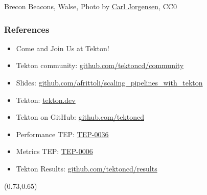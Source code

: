\documentclass[aspectratio=169,11pt,hyperref={colorlinks=true}]{beamer}
\begin{document}
\begin{sectionwithpiclargecentral}{Brecon Beacons, Walse, Photo by \href{https://unsplash.com/@scamartist}{\underline{Carl Jorgensen}}, CC0}
\end{sectionwithpiclargecentral}

\begin{blackframe}
  \frametitle{References}
  \begin{itemize}
    \item \large Come and Join Us at Tekton!
    \item \normalsize Tekton community: \href{https://github.com/tektoncd/community}{github.com/tektoncd/community} \\
  \end{itemize}
  \begin{itemize}
    \item Slides: \href{https://github.com/afrittoli/scaling_pipelines_with_tekton/blob/scd2021/scaling_pipelines_with_tekton.pdf}{github.com/afrittoli/scaling\_pipelines\_with\_tekton}
    \item Tekton: \href{https://tekton.dev}{tekton.dev}
    \item Tekton on GitHub: \href{https://github.com/tektoncd}{github.com/tektoncd}
    \item Performance TEP: \href{https://github.com/tektoncd/community/blob/master/teps/0036-start-measuring-tekton-pipelines-performance.md}{TEP-0036}
    \item Metrics TEP: \href{https://github.com/tektoncd/community/blob/master/teps/0006-tekton-metrics.md}{TEP-0006}
    \item Tekton Results: \href{https://github.com/tektoncd/results}{github.com/tektoncd/results}
  \end{itemize}
  \begin{textblock*}{0.13\paperwidth}(0.73\paperwidth,0.65\paperheight)
    
  \end{textblock*}
\end{blackframe}
\end{document}
